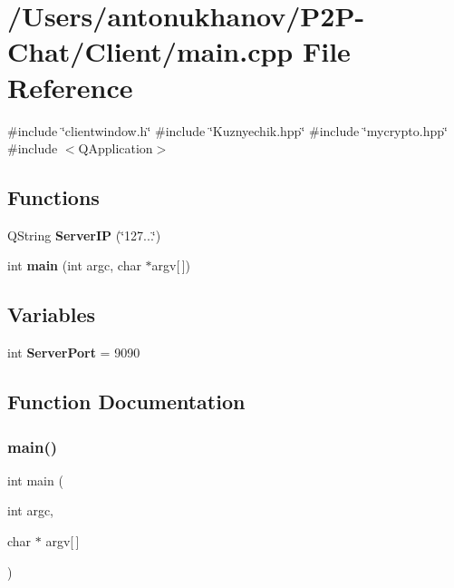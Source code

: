 \section{/\+Users/antonukhanov/\+P2\+P-\/\+Chat/\+Client/main.cpp File Reference}
\label{main_8cpp}
{\ttfamily \#include \char`\"{}clientwindow.\+h\char`\"{}}\newline
{\ttfamily \#include \char`\"{}Kuznyechik.\+hpp\char`\"{}}\newline
{\ttfamily \#include \char`\"{}mycrypto.\+hpp\char`\"{}}\newline
{\ttfamily \#include $<$Q\+Application$>$}\newline
\subsection*{Functions}
\begin{DoxyCompactItemize}
\item 
Q\+String \textbf{ Server\+IP} (\char`\"{}127...\char`\"{})
\item 
int \textbf{ main} (int argc, char $\ast$argv[$\,$])
\end{DoxyCompactItemize}
\subsection*{Variables}
\begin{DoxyCompactItemize}
\item 
int \textbf{ Server\+Port} = 9090
\end{DoxyCompactItemize}


\subsection{Function Documentation}
\mbox{\label{main_8cpp_a0ddf1224851353fc92bfbff6f499fa97}} 
\subsubsection{main()}
{\footnotesize\ttfamily int main (\begin{DoxyParamCaption}\item[{int}]{argc,  }\item[{char $\ast$}]{argv[$\,$] }\end{DoxyParamCaption})}

